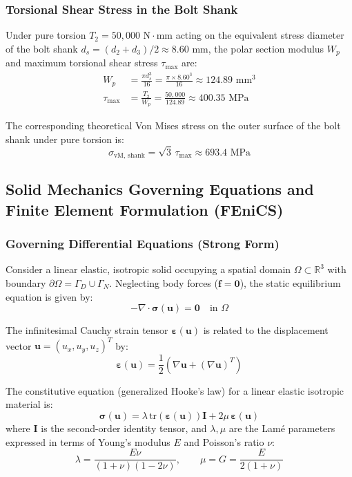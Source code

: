 \documentclass[12pt,a4paper]{article}
\begin{document}
\subsubsection{Torsional Shear Stress in the Bolt Shank}
Under pure torsion $T_2 = 50,000\text{ N}\cdot\text{mm}$ acting on the equivalent stress diameter of the bolt shank $d_s = (d_2 + d_3)/2 \approx 8.60\text{ mm}$, the polar section modulus $W_p$ and maximum torsional shear stress $\tau_{\max}$ are:
\begin{align}
    W_p &= \frac{\pi d_s^3}{16} = \frac{\pi \times 8.60^3}{16} \approx 124.89\text{ mm}^3 \\
    \tau_{\max} &= \frac{T_2}{W_p} = \frac{50,000}{124.89} \approx 400.35\text{ MPa}
\end{align}

The corresponding theoretical Von Mises stress on the outer surface of the bolt shank under pure torsion is:
\begin{equation}
    \sigma_{\text{vM, shank}} = \sqrt{3} \, \tau_{\max} \approx 693.4\text{ MPa}
\end{equation}

\subsection{Solid Mechanics Governing Equations and Finite Element Formulation (FEniCS)}

\subsubsection{Governing Differential Equations (Strong Form)}
Consider a linear elastic, isotropic solid occupying a spatial domain $\Omega \subset \mathbb{R}^3$ with boundary $\partial\Omega = \Gamma_D \cup \Gamma_N$. Neglecting body forces ($\mathbf{f} = \mathbf{0}$), the static equilibrium equation is given by:
\begin{equation}
    -\nabla \cdot \boldsymbol{\sigma}(\mathbf{u}) = \mathbf{0} \quad \text{in } \Omega
\end{equation}

The infinitesimal Cauchy strain tensor $\boldsymbol{\varepsilon}(\mathbf{u})$ is related to the displacement vector $\mathbf{u} = (u_x, u_y, u_z)^T$ by:
\begin{equation}
    \boldsymbol{\varepsilon}(\mathbf{u}) = \frac{1}{2} \left( \nabla\mathbf{u} + (\nabla\mathbf{u})^T \right)
\end{equation}

The constitutive equation (generalized Hooke's law) for a linear elastic isotropic material is:
\begin{equation}
    \boldsymbol{\sigma}(\mathbf{u}) = \lambda \, \text{tr}(\boldsymbol{\varepsilon}(\mathbf{u})) \mathbf{I} + 2\mu \, \boldsymbol{\varepsilon}(\mathbf{u})
\end{equation}
where $\mathbf{I}$ is the second-order identity tensor, and $\lambda, \mu$ are the Lam\'e parameters expressed in terms of Young's modulus $E$ and Poisson's ratio $\nu$:
\begin{equation}
    \lambda = \frac{E\nu}{(1 + \nu)(1 - 2\nu)}, \qquad \mu = G = \frac{E}{2(1 + \nu)}
\end{equation}
\end{document}
